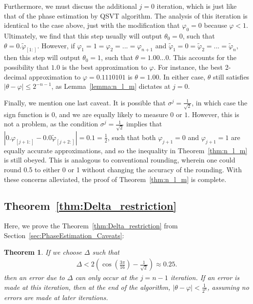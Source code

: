 \documentclass[aps,pra,showpacs,notitlepage,twocolumn,superscriptaddress,nofootinbib]{revtex4-1}
\newtheorem{theorem}{Theorem}
\begin{document}
Furthermore, we must discuss the additional $j=0$ iteration, which is just like that of the phase estimation by QSVT algorithm. The analysis of this iteration is identical to the case above, just with the modification that $\varphi_0 = 0$ because $\varphi <1$. Ultimately, we find that this step usually will output $\theta_0 = 0$, such that $\theta = 0.\tilde{\varphi}_{[1:]}$. However, if $\varphi_1 = 1 = \varphi_2 = ... = \varphi_{n+1}$ and $\tilde{\varphi}_1 = 0 = \tilde{\varphi}_2 = ... = \tilde{\varphi}_{n}$, then this step will output $\theta_0 = 1$, such that $\theta = 1.00...0$. This accounts for the possibility that $1.0$ is the best approximation to $\varphi$. For instance, the best 2-decimal approximation to $\varphi = 0.1110101$ is $\theta = 1.00$. In either case, $\theta$ still satisfies $|\theta - \varphi| \leq 2^{-n-1}$, as Lemma~\ref{lemma:n_l_m} dictates at $j=0$.  

Finally, we mention one last caveat. It is possible that $\sigma^j = \frac{1}{\sqrt{2}}$, in which case the sign function is $0$, and we are equally likely to measure $0$ or $1$. However, this is not a problem, as the condition $\sigma^j = \frac{1}{\sqrt{2}}$ implies that $|0.\varphi_{[j+1:]} - 0.0\tilde{\varphi}_{[j+2:]}| = 0.1 = \frac{1}{2}$, such that both $\varphi_{j+1} = 0$ and $\varphi_{j+1} = 1$ are equally accurate approximations, and so the inequality in Theorem~\ref{thm:n_l_m} is still obeyed. This is analogous to conventional rounding, wherein one could round 0.5 to either 0 or 1 without changing the accuracy of the rounding. With these concerns alleviated, the proof of Theorem~\ref{thm:n_l_m} is complete. 


\subsection{Theorem~\ref{thm:Delta_restriction}} \label{sec:Delta_mitigation}
Here, we prove the Theorem~\ref{thm:Delta_restriction} from Section~\ref{sec:PhaseEstimation_Caveats}:
\begingroup
\def\thetheorem{\ref{thm:Delta_restriction}}
    \begin{theorem}
    If we choose $\Delta$ such that 
        \begin{equation}
        \begin{gathered}
            \Delta < 2\left(\cos(\frac{3\pi}{16}) - \frac{1}{\sqrt{2}} \right) \approx 0.25.
        \end{gathered}
        \end{equation}
    then an error due to $\Delta$ can only occur at the $j=n-1$ iteration. If an error is made at this iteration, then at the end of the algorithm, $|\theta - \varphi| < \frac{1}{2^n}$, assuming no errors are made at later iterations.
    \end{theorem}
\addtocounter{theorem}{-1}
\endgroup
\end{document}

